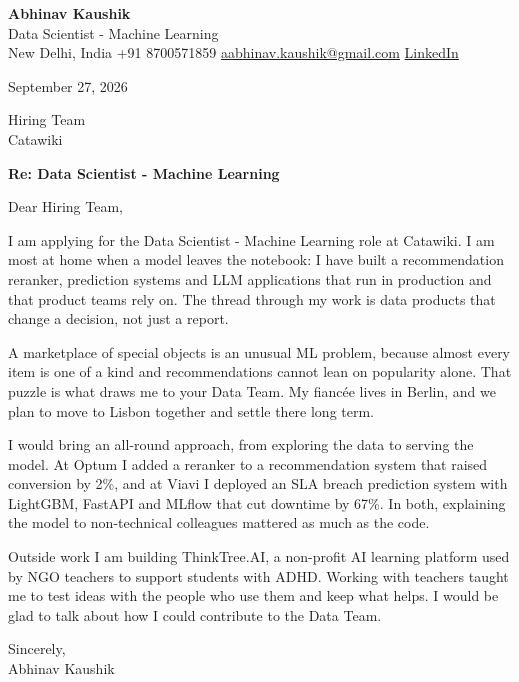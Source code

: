 \documentclass[11pt,a4paper]{article}
\begin{document}
{\Large\bfseries Abhinav Kaushik}\\
Data Scientist - Machine Learning\\
New Delhi, India \textbar{} +91 8700571859 \textbar{} \href{mailto:aabhinav.kaushik@gmail.com}{aabhinav.kaushik@gmail.com} \textbar{} \href{https://www.linkedin.com/in/abhinav-kaushik10/}{LinkedIn}  

September 27, 2026

Hiring Team\\
Catawiki

\textbf{Re: Data Scientist - Machine Learning}

Dear Hiring Team,

I am applying for the Data Scientist - Machine Learning role at Catawiki. I am most at home when a model leaves the notebook: I have built a recommendation reranker, prediction systems and LLM applications that run in production and that product teams rely on. The thread through my work is data products that change a decision, not just a report.

A marketplace of special objects is an unusual ML problem, because almost every item is one of a kind and recommendations cannot lean on popularity alone. That puzzle is what draws me to your Data Team. My fiancée lives in Berlin, and we plan to move to Lisbon together and settle there long term.

I would bring an all-round approach, from exploring the data to serving the model. At Optum I added a reranker to a recommendation system that raised conversion by 2\%, and at Viavi I deployed an SLA breach prediction system with LightGBM, FastAPI and MLflow that cut downtime by 67\%. In both, explaining the model to non-technical colleagues mattered as much as the code.

Outside work I am building ThinkTree.AI, a non-profit AI learning platform used by NGO teachers to support students with ADHD. Working with teachers taught me to test ideas with the people who use them and keep what helps. I would be glad to talk about how I could contribute to the Data Team.

Sincerely,\\[4pt]
Abhinav Kaushik
\end{document}
